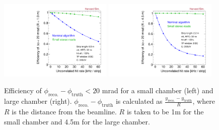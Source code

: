 \begin{figure}[!htpb]
  \begin{center}
    \includegraphics[width=0.48\textwidth]{figures/eff_phi_small_vs_rate.pdf}
    \includegraphics[width=0.48\textwidth]{figures/eff_phi_large_vs_rate.pdf}
  \end{center}
  \vspace{-10pt}
  \caption{Efficiency of $\phi_\text{reco.} - \phi_\text{truth} < 20$ mrad for a small chamber (left) and large chamber (right). $\phi_\text{reco.}-\phi_\text{truth}$ is calculated as $\frac{y_\text{reco.} - y_\text{truth}}{R}$, where $R$ is the distance from the beamline. $R$ is taken to be 1m for the small chamber and 4.5m for the large chamber.}
  \label{fig:eff_vs_rate}
\end{figure}

